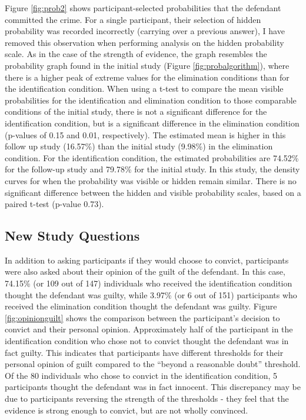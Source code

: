 \documentclass[print]{nuthesis}
\begin{document}
Figure \ref{fig:prob2} shows participant-selected probabilities that the defendant committed the crime.
For a single participant, their selection of hidden probability was recorded incorrectly (carrying over a previous answer), I have removed this observation when performing analysis on the hidden probability scale.
As in the case of the strength of evidence, the graph resembles the probability graph found in the initial study (Figure \ref{fig:probalgorithm}), where there is a higher peak of extreme values for the elimination conditions than for the identification condition.
When using a t-test to compare the mean visible probabilities for the identification and elimination condition to those comparable conditions of the initial study, there is not a significant difference for the identification condition, but is a significant difference in the elimination condition (p-values of 0.15 and 0.01, respectively).
The estimated mean is higher in this follow up study (16.57\%) than the initial study (9.98\%) in the elimination condition.
For the identification condition, the estimated probabilities are 74.52\% for the follow-up study and 79.78\% for the initial study.
In this study, the density curves for when the probability was visible or hidden remain similar.
There is no significant difference between the hidden and visible probability scales, based on a paired t-test (p-value 0.73).

\hypertarget{new-study-questions}{%
\subsection{New Study Questions}\label{new-study-questions}}

In addition to asking participants if they would choose to convict, participants were also asked about their opinion of the guilt of the defendant.
In this case, 74.15\% (or 109 out of 147) individuals who received the identification condition thought the defendant was guilty, while 3.97\% (or 6 out of 151) participants who received the elimination condition thought the defendant was guilty.
Figure \ref{fig:opinionguilt} shows the comparison between the participant's decision to convict and their personal opinion.
Approximately half of the participant in the identification condition who chose not to convict thought the defendant was in fact guilty.
This indicates that participants have different thresholds for their personal opinion of guilt compared to the ``beyond a reasonable doubt'' threshold.
Of the 80 individuals who chose to convict in the identification condition, 5 participants thought the defendant was in fact innocent.
This discrepancy may be due to participants reversing the strength of the thresholds - they feel that the evidence is strong enough to convict, but are not wholly convinced.
\end{document}
